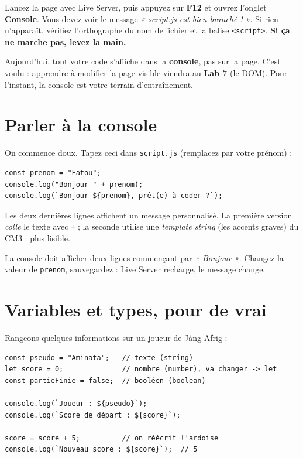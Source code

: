 \documentclass[11pt,a4paper]{article}
\newcommand{\code}[1]{\texttt{#1}}
\begin{document}
\begin{infobox}[Vérification]
Lancez la page avec Live Server, puis appuyez sur \textbf{F12} et ouvrez l'onglet \textbf{Console}. Vous devez voir le message \emph{« script.js est bien branché ! »}. Si rien n'apparaît, vérifiez l'orthographe du nom de fichier et la balise \code{<script>}. \textbf{Si ça ne marche pas, levez la main.}
\end{infobox}

\begin{attentionbox}
Aujourd'hui, tout votre code s'affiche dans la \textbf{console}, pas sur la page. C'est voulu : apprendre à modifier la page visible viendra au \textbf{Lab 7} (le DOM). Pour l'instant, la console est votre terrain d'entraînement.
\end{attentionbox}

\section{Parler à la console}

On commence doux. Tapez ceci dans \code{script.js} (remplacez par votre prénom) :

\begin{lstlisting}[style=js]
const prenom = "Fatou";
console.log("Bonjour " + prenom);
console.log(`Bonjour ${prenom}, prêt(e) à coder ?`);
\end{lstlisting}

Les deux dernières lignes affichent un message personnalisé. La première version \emph{colle} le texte avec \code{+} ; la seconde utilise une \emph{template string} (les accents graves) du CM3 : plus lisible.

\begin{infobox}[Vérification]
La console doit afficher deux lignes commençant par \emph{« Bonjour »}. Changez la valeur de \code{prenom}, sauvegardez : Live Server recharge, le message change.
\end{infobox}

\section{Variables et types, pour de vrai}

Rangeons quelques informations sur un joueur de Jàng Afrig :

\begin{lstlisting}[style=js]
const pseudo = "Aminata";   // texte (string)
let score = 0;              // nombre (number), va changer -> let
const partieFinie = false;  // booléen (boolean)

console.log(`Joueur : ${pseudo}`);
console.log(`Score de départ : ${score}`);

score = score + 5;          // on réécrit l'ardoise
console.log(`Nouveau score : ${score}`);  // 5
\end{lstlisting}
\end{document}
